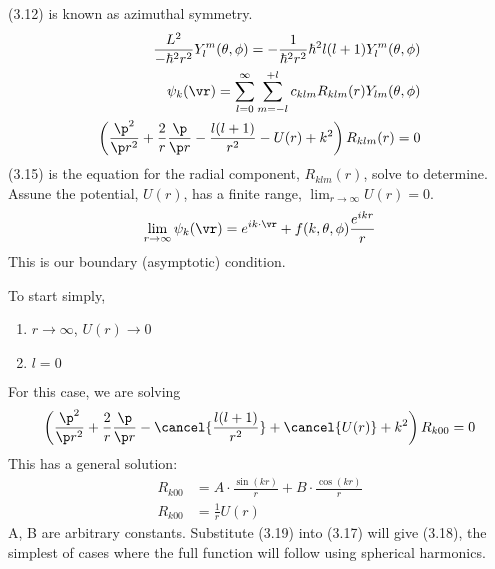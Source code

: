 \documentclass[a4paper, 11pt, normalem]{report}
\begin{document}
(3.12) is known as azimuthal symmetry.
\begin{align}
    \frac{L^2}{-\hbar^2r^2}Y^m_l(\theta,\phi) = -\frac{1}{\hbar^2r^2}\hbar^2 l(l+1)Y^m_l(\theta,\phi) \\
    \psi_k(\vr) = \sum_{l=0}^\infty \sum_{m=-l}^{+l} c_{klm} R_{klm}(r)Y_{lm}(\theta,\phi) \\
    \left(\frac{\p^2}{\p r^2} + \frac{2}{r}\frac{\p}{\p r} - \frac{l(l+1)}{r^2} - U(r) + k^2\right)R_{klm}(r) = 0
\end{align}
(3.15) is the equation for the radial component, $R_{klm}(r)$, solve to determine.
Assune the potential, $U(r)$, has a finite range, $\lim_{r\to\infty}U(r) = 0$.
\begin{align}
    \lim_{r\to\infty} \psi_k(\vr) = e^{ik\cdot \vr} + f(k,\theta,\phi)\frac{e^{ikr}}{r}
\end{align}
This is our boundary (asymptotic) condition.

To start simply,
\begin{enumerate}
    \item $r\to\infty$, $U(r) \to 0$
    \item $l=0$
\end{enumerate}
For this case, we are solving
\begin{align}
    \left(\frac{\p^2}{\p r^2} + \frac{2}{r}\frac{\p}{\p r} - \cancel{\frac{l(l+1)}{r^2}} + \cancel{U(r)} + k^2\right)R_{k00} = 0
\end{align}
This has a general solution:
\begin{align}
    R_{k00} &= A\cdot\frac{\sin(kr)}{r} + B\cdot\frac{\cos(kr)}{r} \\
    R_{k00} &= \frac{1}{r}U(r) 
\end{align}
A, B are arbitrary constants.
Substitute (3.19) into (3.17) will give (3.18), the simplest of cases where the full function will follow using spherical harmonics.

\chapter{}
\end{document}
